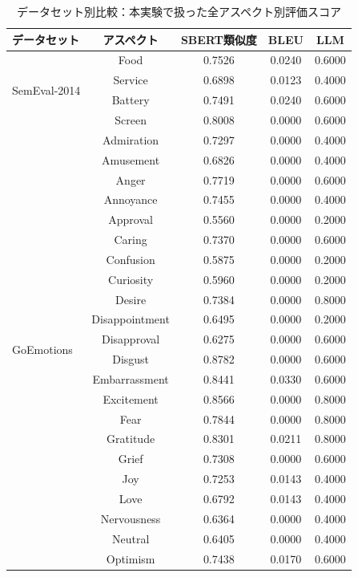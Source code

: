 \begin{table}[htbp]
  \centering
  \caption{データセット別比較：本実験で扱った全アスペクト別評価スコア}
  \label{tab:appendix_all_aspects_dataset_comparison}
  \small
  \begin{tabular}{lcccc}
    \toprule
    データセット & アスペクト & SBERT類似度 & BLEU & LLM \\
    \midrule
    \multirow{4}{*}{SemEval-2014} & Food & 0.7526 & 0.0240 & 0.6000 \\
    & Service & 0.6898 & 0.0123 & 0.4000 \\
    & Battery & 0.7491 & 0.0240 & 0.6000 \\
    & Screen & 0.8008 & 0.0000 & 0.6000 \\
    \midrule
    \multirow{28}{*}{GoEmotions} & Admiration & 0.7297 & 0.0000 & 0.4000 \\
    & Amusement & 0.6826 & 0.0000 & 0.4000 \\
    & Anger & 0.7719 & 0.0000 & 0.6000 \\
    & Annoyance & 0.7455 & 0.0000 & 0.4000 \\
    & Approval & 0.5560 & 0.0000 & 0.2000 \\
    & Caring & 0.7370 & 0.0000 & 0.6000 \\
    & Confusion & 0.5875 & 0.0000 & 0.2000 \\
    & Curiosity & 0.5960 & 0.0000 & 0.2000 \\
    & Desire & 0.7384 & 0.0000 & 0.8000 \\
    & Disappointment & 0.6495 & 0.0000 & 0.2000 \\
    & Disapproval & 0.6275 & 0.0000 & 0.6000 \\
    & Disgust & 0.8782 & 0.0000 & 0.6000 \\
    & Embarrassment & 0.8441 & 0.0330 & 0.6000 \\
    & Excitement & 0.8566 & 0.0000 & 0.8000 \\
    & Fear & 0.7844 & 0.0000 & 0.8000 \\
    & Gratitude & 0.8301 & 0.0211 & 0.8000 \\
    & Grief & 0.7308 & 0.0000 & 0.6000 \\
    & Joy & 0.7253 & 0.0143 & 0.4000 \\
    & Love & 0.6792 & 0.0143 & 0.4000 \\
    & Nervousness & 0.6364 & 0.0000 & 0.4000 \\
    & Neutral & 0.6405 & 0.0000 & 0.4000 \\
    & Optimism & 0.7438 & 0.0170 & 0.6000 \\

\end{tabular}
\end{table}
